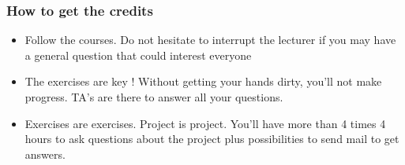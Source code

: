 \begin{frame}[containsverbatim]
\frametitle{How to get the credits}

\begin{itemize}

	\item Follow the courses. Do not hesitate to interrupt the lecturer if you may have a general question that could interest everyone

	\item The exercises are key ! Without getting your hands dirty, you'll not make progress. TA's are there to answer all your questions.

	\item Exercises are exercises. Project is project. You'll have more than 4 times 4 hours to ask questions about the project plus possibilities to send mail to get answers. 

\end{itemize}


\end{frame}



